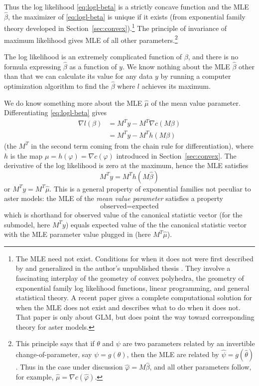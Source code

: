 \documentclass[11pt]{article}
\begin{document}
Thus the log likelihood \eqref{eq:logl-beta} is a strictly concave function
and the MLE $\hat{\beta}$, the maximizer of \eqref{eq:logl-beta} is unique
if it exists (from exponential family theory developed
in Section~\ref{sec:convex}).\footnote{The MLE need not exist.  Conditions
for when it does not were first described by \citet{barndorff} and generalized
in the author's unpublished thesis \citep{thesis}.  They involve a fascinating
interplay of the geometry of convex polyhedra, the geometry of exponential
family log likelihood functions, linear programming, and general statistical
theory.  A recent paper \citep{gdor} gives a complete computational solution
for when the MLE does not exist and describes what to do when it does not.
That paper is only about GLM, but does point the way toward corresponding
theory for aster models.\label{foot:barndorff-complete}}
The principle of invariance of maximum likelihood gives MLE
of all other parameters.\footnote{This principle says that if $\theta$ and
$\psi$ are two parameters related by an invertible change-of-parameter,
say $\psi = g(\theta)$, then the MLE are related
by $\hat{\psi} = g(\hat{\theta})$.  Thus in the case under discussion
$\hat{\varphi} = M \hat{\beta}$, and all other parameters follow, for example,
$\hat{\mu} = \nabla c(\hat{\varphi})$.\label{foot:invariance}}

The log likelihood is an extremely complicated function of $\beta$, and
there is no formula expressing $\hat{\beta}$ as a function of $y$.
We know nothing about the MLE $\hat{\beta}$
other than that we can calculate its value for any data $y$ by running
a computer optimization algorithm to find the $\hat{\beta}$ where $l$ achieves
its maximum.

We do know something more about the MLE $\hat{\mu}$ of the mean value
parameter.  Differentiating \eqref{eq:logl-beta} gives
\begin{align*}
   \nabla l(\beta)
   & =
   M^T y - M^T \nabla c(M \beta)
   \\
   & =
   M^T y - M^T h(M \beta)
\end{align*}
(the $M^T$ in the second term coming from the chain rule for differentiation),
where $h$ is the map $\mu = h(\varphi) = \nabla c(\varphi)$ introduced in
Section~\ref{sec:convex}.
The derivative of the log likelihood is zero at the maximum, hence the MLE
satisfies
$$
   M^T y = M^T h(M \hat{\beta})
$$
or $M^T y = M^T \hat{\mu}$.  This is a general property of exponential
families not peculiar to aster models: the MLE of
the \emph{mean value parameter} satisfies a property
$$
   \text{observed}
   =
   \text{expected}
$$
which is shorthand for observed value of the canonical statistic vector
(for the submodel, here $M^T y$) equals expected value of the the canonical
statistic vector
with the MLE parameter value plugged in (here $M^T \hat{\mu}$).
\end{document}
